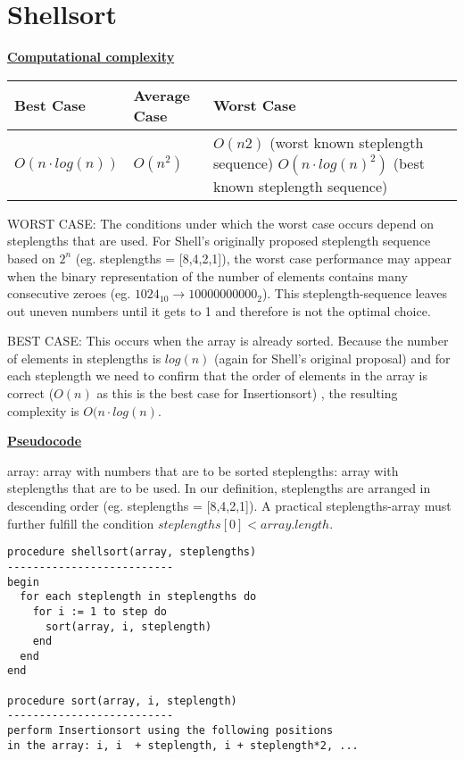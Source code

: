 \documentclass[a4paper]{report}
\begin{document}
\chapter*{Shellsort}

\underline{\bf{Computational complexity}}

\begin{tabular}{|l|l|p{7cm} l |}
\hline
Best Case    & Average Case  &  Worst Case\\ \hline
$O(n\cdot log(n))$ & $O(n^2)$  &  $O(n2)$ (worst known steplength sequence) $O(n\cdot log(n)^2)$ (best known steplength sequence) \\ \hline
\end{tabular}

WORST CASE: The conditions under which the worst case occurs depend on steplengths that are used. For Shell's originally proposed steplength sequence based on $2^n$ (eg. steplengths = [8,4,2,1]), the worst case performance may appear when the binary representation of the number of elements contains many consecutive zeroes (eg. $1024_{10} \rightarrow 10000000000_2$). This steplength-sequence leaves out uneven numbers until it gets to 1 and therefore is not the optimal choice.

BEST CASE: This occurs when the array is already sorted. Because the number of elements in steplengths is $log(n)$ (again for Shell's original proposal) and for each steplength we need to confirm that the order of elements in the array is correct ($O(n)$ as this is the best case for Insertionsort) , the resulting complexity is $O(n \cdot log(n)$.


\underline{\bf{Pseudocode}}

array: array with numbers that are to be sorted
steplengths: array with steplengths that are to be used. In our definition, steplengths are arranged in descending order (eg. steplengths = [8,4,2,1]). A practical steplengths-array must further fulfill the condition $steplengths[0] < array.length$. 


\begin{lstlisting}
procedure shellsort(array, steplengths)
--------------------------
begin
  for each steplength in steplengths do
    for i := 1 to step do
  	  sort(array, i, steplength)   
    end
  end
end

procedure sort(array, i, steplength)
--------------------------
perform Insertionsort using the following positions
in the array: i, i  + steplength, i + steplength*2, ...

\end{lstlisting}
\end{document}
